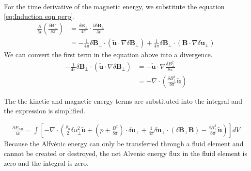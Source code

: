 For the time derivative of the magnetic energy, we substitute the equation \eqref{eq:Induction eqn perp}.
\begin{equation}
    \begin{split}
        \frac{\partial}{\partial t}\left( \frac{\delta \boldsymbol{B}_{\perp}^2}{8\pi}\right)
        &= \frac{\delta \boldsymbol{B}_{\perp}}{4\pi} \cdot \frac{\partial \delta \boldsymbol{B}_{\perp}}{\partial t}\\
        &= -\frac{1}{4\pi} \delta \boldsymbol{B}_{\perp}\cdot ( \tilde{\boldsymbol{u}} \cdot \nabla \delta \boldsymbol{B}_{\perp}) + \frac{1}{4\pi} \delta \boldsymbol{B}_{\perp}\cdot (\boldsymbol{B} \cdot \nabla \delta \boldsymbol{u}_{\perp})
    \end{split}
\end{equation}
We can convert the first term in the equation above into a divergence.
\begin{equation*}
    \begin{split}
        -\frac{1}{4\pi} \delta \boldsymbol{B}_{\perp}\cdot ( \tilde{\boldsymbol{u}} \cdot \nabla \delta \boldsymbol{B}_{\perp})
        &=-\tilde{\boldsymbol{u}} \cdot \nabla \frac{\delta B_{\perp}^2}{8\pi}\\
        &=-\nabla \cdot \left(\frac{\delta B_{\perp}^2}{8\pi}  \tilde{\boldsymbol{u}} \right)
    \end{split}
\end{equation*}

The the kinetic and magnetic energy terms are substituted into the integral and the expression is simplified.

\begin{equation*}
 \begin{split}
    \frac{\partial E_{\mathrm{Alf}}}{\partial t} = \int \left[- \nabla \cdot \left(\frac{\rho_{0}}{2}\delta u_{\perp}^2  \tilde{\boldsymbol{u}} + \left( p +\frac{B^2}{8\pi}\right) \cdot \delta \boldsymbol{u}_{\perp} +\frac{1}{4\pi}\delta \boldsymbol{u}_{\perp} \cdot(\delta \boldsymbol{B}_{\perp} \boldsymbol{B}) - \frac{\delta B_{\perp}^2}{8\pi}  \tilde{\boldsymbol{u}}\right)\right] dV
 \end{split}
\end{equation*}
Because the Alfv\'enic energy can only be transferred through a fluid element and cannot be created or destroyed, the net Alvenic energy flux in the fluid element is zero and the integral is zero.

